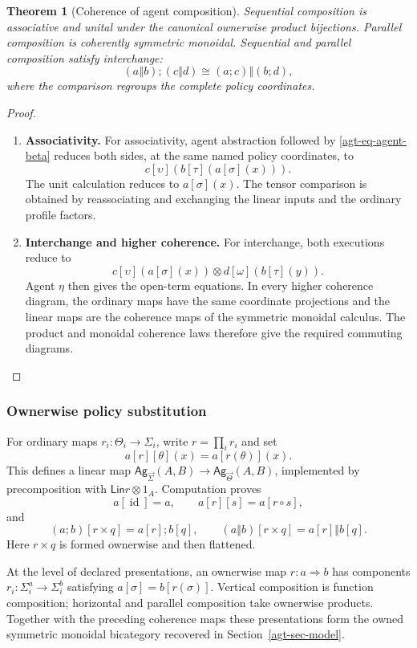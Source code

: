 \documentclass[11pt,a4paper]{article}
\numberwithin{equation}{section}
\newtheorem{theorem}{Theorem}[section]
\theoremstyle{definition}
\theoremstyle{remark}
\theoremstyle{plain}
\providecommand{\Ag}{\mathsf{Ag}}
\providecommand{\sig}{\vec{\Sigma}}
\providecommand{\ths}{\vec{\Theta}}
\providecommand{\Lin}{\mathsf{Lin}}
\providecommand{\id}{\mathop{\mathrm{id}}}
\providecommand{\seq}{\mathbin{;}}
\providecommand{\parcomp}{\mathbin{\Vert}}
\begin{document}
\begin{theorem}[Coherence of agent composition]
\label{agt-thm-agent-coherence}
Sequential composition is associative and unital under the canonical
ownerwise product bijections. Parallel composition is coherently symmetric
monoidal. Sequential and parallel composition satisfy interchange:
\[
 (a\parcomp b)\seq(c\parcomp d)
 \cong(a\seq c)\parcomp(b\seq d),
\]
where the comparison regroups the complete policy coordinates.
\end{theorem}
\begin{proof}
\leavevmode
\begin{enumerate}[label=\textup{(\arabic*)},leftmargin=*,itemsep=4pt,topsep=3pt]
  \item \textbf{Associativity.} For associativity, agent abstraction followed by
\eqref{agt-eq-agent-beta} reduces both sides, at the same named
policy coordinates, to
\[
 c[\upsilon](b[\tau](a[\sigma](x))).
\]
The unit calculation reduces to $a[\sigma](x)$. The tensor comparison is
obtained by reassociating and exchanging the linear inputs and the ordinary
profile factors.
  \item \textbf{Interchange and higher coherence.} For interchange, both executions reduce to
\[
 c[\upsilon](a[\sigma](x))\otimes
 d[\omega](b[\tau](y)).
\]
Agent $\eta$ then gives the open-term equations. In every higher coherence diagram, the ordinary maps have the same
coordinate projections and the linear maps are the coherence maps of the
symmetric monoidal calculus. The product and monoidal coherence laws
therefore give the required commuting diagrams.
\end{enumerate}
\end{proof}

\subsubsection{Ownerwise policy substitution}

For ordinary maps $r_i:\Theta_i\to\Sigma_i$, write $r=\prod_i r_i$ and set
\[
 a[r][\theta](x)=a[r(\theta)](x).
\]
This defines a linear map
$\Ag_{\sig}(A,B)\to\Ag_{\ths}(A,B)$, implemented by precomposition with
$\Lin r\otimes1_A$. Computation proves
\[
 a[\id]=a,\qquad a[r][s]=a[r\circ s],
\]
and
\[
 (a\seq b)[r\times q]=a[r]\seq b[q],\qquad
 (a\parcomp b)[r\times q]=a[r]\parcomp b[q].
\]
Here $r\times q$ is formed ownerwise and then flattened.

At the level of declared presentations, an ownerwise map $r:a\Rightarrow b$
has components $r_i:\Sigma_i^a\to\Sigma_i^b$ satisfying
$a[\sigma]=b[r(\sigma)]$. Vertical composition is function composition;
horizontal and parallel composition take ownerwise products. Together with
the preceding coherence maps these presentations form the owned
symmetric monoidal bicategory recovered in Section~\ref{agt-sec-model}.
\end{document}
